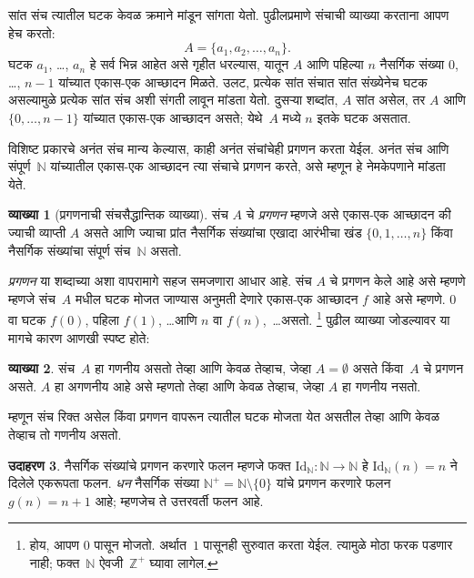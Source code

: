 \documentclass[11pt,a4paper,openany]{book}
\theoremstyle{definition}
\newtheorem{defn}{व्याख्या}[section]
\newtheorem{ex}[defn]{उदाहरण}
\newenvironment{explain}{}{}
\newcommand{\Nat}{\mathbb{N}}
\newcommand{\PosInt}{\mathbb{Z}^{+}}
\newcommand{\Id}[1]{\mathord{\mathrm{Id}_{#1}}}
\begin{document}
सांत संच त्यातील घटक केवळ क्रमाने मांडून सांगता येतो. पुढीलप्रमाणे
संचाची व्याख्या करताना आपण हेच करतो:
\[
  A = \{a_1, a_2, \ldots, a_n\}.
\]
घटक $a_1$, \dots, $a_n$ हे सर्व भिन्न आहेत असे गृहीत धरल्यास,
यातून $A$ आणि पहिल्या $n$ नैसर्गिक संख्या $0$, \dots, $n-1$ यांच्यात
एकास-एक आच्छादन मिळते. उलट, प्रत्येक सांत संचात सांत संख्येनेच
घटक असल्यामुळे प्रत्येक सांत संच अशी संगती लावून मांडता येतो.
दुसऱ्या शब्दांत, $A$ सांत असेल, तर $A$ आणि $\{0, \dots, n-1\}$
यांच्यात एकास-एक आच्छादन असते; येथे~$A$ मध्ये $n$ इतके घटक
असतात.

विशिष्ट प्रकारचे अनंत संच मान्य केल्यास, काही अनंत संचांचेही प्रगणन
करता येईल. अनंत संच आणि संपूर्ण~$\Nat$ यांच्यातील एकास-एक आच्छादन त्या
संचाचे प्रगणन करते, असे म्हणून हे नेमकेपणाने मांडता येते.

\begin{defn}[प्रगणनाची संचसैद्धान्तिक व्याख्या]
संच $A$ चे \emph{प्रगणन} म्हणजे असे एकास-एक आच्छादन की ज्याची व्याप्ती
$A$ असते आणि ज्याचा प्रांत नैसर्गिक संख्यांचा एखादा आरंभीचा खंड $\{0,
1, \ldots, n\}$ {किंवा} नैसर्गिक संख्यांचा संपूर्ण संच~$\Nat$ असतो.
\end{defn}

\begin{explain}
\emph{प्रगणन} या शब्दाच्या अशा वापरामागे सहज समजणारा आधार आहे.
संच $A$ चे प्रगणन केले आहे असे म्हणणे म्हणजे संच~$A$ मधील घटक मोजत
जाण्यास अनुमती देणारे एकास-एक आच्छादन $f$ आहे असे म्हणणे. $0$ वा घटक
$f(0)$, पहिला $f(1)$, \ldots आणि $n$ वा $f(n)$,~\ldots असतो.
\footnote{होय, आपण $0$ पासून मोजतो. अर्थात~$1$ पासूनही सुरुवात करता
येईल. त्यामुळे मोठा फरक पडणार नाही; फक्त~$\Nat$ ऐवजी~$\PosInt$
घ्यावा लागेल.} पुढील व्याख्या जोडल्यावर या मागचे कारण आणखी स्पष्ट होते:
\end{explain}

\begin{defn}
  \label{sfr:siz:enm-alt:defn:enumerable}
  संच~$A$ हा गणनीय असतो तेव्हा आणि केवळ तेव्हाच, जेव्हा
  $A = \emptyset$ असते किंवा~$A$ चे प्रगणन असते. $A$ हा
  अगणनीय आहे असे म्हणतो तेव्हा आणि केवळ तेव्हाच, जेव्हा
  $A$ हा गणनीय नसतो.
\end{defn}

\begin{explain}
म्हणून संच रिक्त असेल किंवा प्रगणन वापरून त्यातील घटक मोजता
येत असतील तेव्हा आणि केवळ तेव्हाच तो गणनीय असतो.
\end{explain}

\begin{ex}
नैसर्गिक संख्यांचे प्रगणन करणारे फलन म्हणजे फक्त $\Id{\Nat} \colon
\Nat \to \Nat$ हे $\Id{\Nat}(n) = n$ ने दिलेले एकरूपता फलन.
\emph{धन} नैसर्गिक संख्या $\Nat^+ = \Nat \setminus \{0\}$ यांचे
प्रगणन करणारे फलन $g(n) = n + 1$ आहे; म्हणजेच ते उत्तरवर्ती फलन आहे.
\end{ex}
\end{document}
